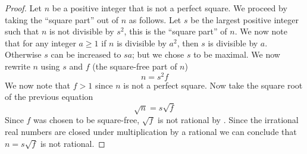        \begin{proof}
            Let $n$ be a positive integer that is not a perfect square. We proceed by taking
            the ``square part'' out of $n$ as follows. Let $s$ be the largest positive integer
            such that $n$ is not divisible by $s^2$, this is the ``square part'' of $n$. We
            now note that for any integer $a \ge 1$ if $n$ is divisible by $a^2$, then
            $s$ is divisible by $a$. Otherwise $s$ can be increased to $sa$; but we chose $s$
            to be maximal. We now rewrite $n$ using $s$ and $f$ (the square-free part of $n$)
            \begin{equation}
                n = s^2 f
            \end{equation}
            We now note that $f > 1$ since $n$ is not a perfect square. Now take the square
            root of the previous equation
            \begin{equation}
                \sqrt{n} = s \sqrt{f}
            \end{equation}
            Since $f$ was chosen to be square-free, $\sqrt{f}$ is not rational by
            . Since the irrational real numbers
            are closed under multiplication by a rational we can conclude that $n = s \sqrt{f}$
            is not rational. \QED
        \end{proof}
